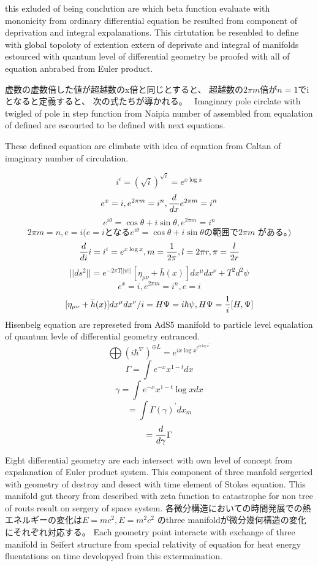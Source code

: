 \documentclass{jsarticle}
\begin{document}
   this exluded of being conclution are which beta function
   evaluate with mononicity from ordinary differential equation
   be resulted from component of deprivation and integral expalanations.
   This cirtutation be resenbled to define with global topoloty of
   extention extern of deprivate and integral of manifolds
   estourced with quantum level of differential geometry be proofed with
   all of equation anbrabed from Euler product.
   

   虚数の虚数倍した値が超越数のx倍と同じとすると、
   超越数の$2 \pi m$倍が$n=1$でiとなると定義すると、
   次の式たちが導かれる。　
   Imaginary pole circlate with twigled of pole in step function
   from Naipia number of assembled from equalation of defined are
   escourted to be defined with next equations.


   These defined equation are climbate with idea of equation from
   Caltan of imaginary number of circulation.

   $$ i^i = (\sqrt{i})^{\sqrt{i}} = e^{x \log x} $$
   $$ e^x = i, e^{2\pi m} = i^n, {d \over d x}e^{2\pi m} = i^n $$
   $$ e^{i \theta} = \cos \theta + i \sin \theta, e^{2 \pi m} = i^n $$
   $$ 2 \pi m = n, e = i \text{($e=i$となる$e^{i \theta} = \cos \theta 
   + i \sin \theta $
   の範囲で$2\pi m$ がある。)}$$
   $$ {d \over d i}i = i^i = e^{x \log x}, m={1 \over 2 \pi},l=2\pi r, 
   \pi = {l \over 2r} $$
   $$ ||ds^2|| = e^{-2 \pi T||\psi||}[\eta_{\mu\nu} + \bar{h}(x)]
   dx^{\mu}dx^{\nu} + T^2 d^2 \psi $$
   $$ e^x = i, e^{2\pi m} = i^n, e = i $$
   $$ {{[\eta_{\mu\nu} + \bar{h}(x)]dx^{\mu}dx^{\nu}}/i} = H \Psi
   = i \hbar \psi, H \Psi = {1 \over i}[H, \Psi] $$
     Hisenbelg equation are represeted from AdS5 manifold to particle level
   equalation of quantum levle of differential geometry entranced.
   $$ \bigoplus {({i \hbar} ^{\nabla})}^{\oplus L} = e^{{i x \log x}^{
	   {e^{i x \log x}}^{'}}} $$
   $$ \Gamma = \int e^{-x}x^{1 - t}dx $$
   $$ \gamma = \int e^{-x}x^{1 - t}\log x dx $$
   $$ = \int \Gamma(\gamma)^{'} dx_m$$
   $$ = {d \over d \gamma}\Gamma $$

   Eight differential geometry are each intersect with own level of
   concept from expalanation of Euler product system.
   This component of three manfold sergeried with geometry of destroy and
   desect with time element of Stokes equation.
      This manifold gut theory from described with zeta function to
   catastrophe for non tree of routs result on sergery of space system.
      各微分構造においての時間発展での熱エネルギーの変化は$E=mc^2, E=m^2 c^2 $
   のthree manifoldが微分幾何構造の変化にそれぞれ対応する。
   Each geometry point interacte with exchange of three manifold in
   Seifert structure from special relativity of equation for
   heat energy fluentations on time developyed from this extermaination.
\end{document}
